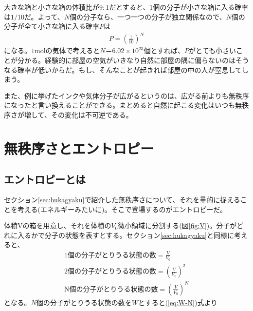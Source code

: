 大きな箱と小さな箱の体積比が$9:1$だとすると、$1$個の分子が小さな箱に入る確率は$1/10$だ。よって、$N$個の分子なら、一つ一つの分子が独立関係なので、$N$個の分子が全て小さな箱に入る確率$P$は
\begin{align}
 P=\left (\frac{1}{10}\right)^N
\end{align}
になる。$1\mathrm{mol}$の気体で考えると$N＝6.02×10^{23}$個とすれば、$P$がとても小さいことが分かる。経験的に部屋の空気がいきなり自然に部屋の隅に偏らないのはそうなる確率が低いからだ。もし、そんなことが起きれば部屋の中の人が窒息してしまう。\par
また、例に挙げたインクや気体分子が広がるというのは、広がる前よりも無秩序になったと言い換えることができる。まとめると自然に起こる変化はいつも無秩序さが増して、その変化は不可逆である。\newpage

%
\section{無秩序さとエントロピー}
\subsection{エントロピーとは}
セクション\ref{sec:hukagyaku}で紹介した無秩序さについて、それを量的に捉えることを考える(エネルギーみたいに)。そこで登場するのがエントロピーだ。\par

体積Vの箱を用意し、それを体積の$V_0$微小領域に分割する(図\ref{fig:V})。分子がどれに入るかで分子の状態を表すとする。セクション\ref{sec:hukagyaku}と同様に考えると、
\begin{align}
  \mathrm{1個の分子がとりうる状態の数} = \frac{V}{V_0}\\
	\mathrm{2個の分子がとりうる状態の数} = \left(\frac{V}{V_0}\right)^2\\
\mathrm{N個の分子がとりうる状態の数} = \left(\frac{V}{V_0}\right)^N \label{eq:W-N}
\end{align}
となる。$N$個の分子がとりうる状態の数を$W$とすると(\ref{eq:W-N})式より

